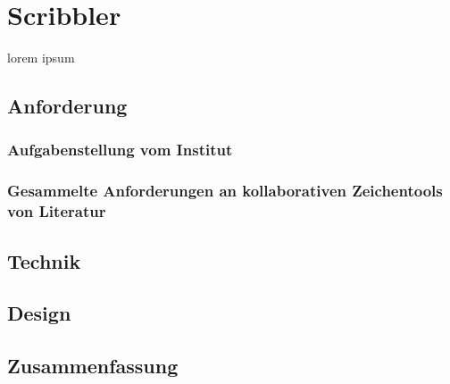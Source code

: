 \chapter{Scribbler}\label{ch:scribbler}

lorem ipsum

\section{Anforderung}

\subsection{Aufgabenstellung vom Institut}

\subsection{Gesammelte Anforderungen an kollaborativen Zeichentools von Literatur}

\section{Technik}

\section{Design}

\section*{Zusammenfassung}
